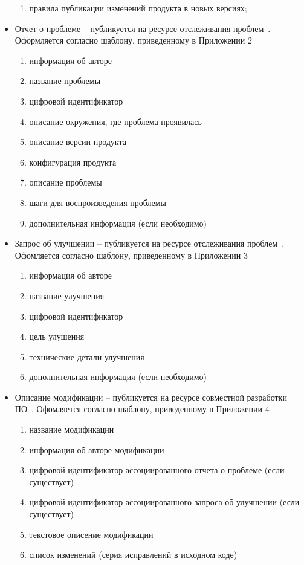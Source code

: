 \begin{itemize}
\begin{enumerate}
        \item правила публикации изменений продукта в новых версиях;
    \end{enumerate}

    \item Отчет о проблеме -- публикуется на ресурсе отслеживания проблем~\cite{qemubugtracker}.
    Оформляется согласно шаблону, приведенному в Приложении 2
    \begin{enumerate}
        \item информация об авторе
        \item название проблемы
        \item цифровой идентификатор
        \item описание окружения, где проблема проявилась
        \item описание версии продукта
        \item конфигурация продукта
        \item описание проблемы
        \item шаги для воспроизведения проблемы
        \item дополнительная информация (если необходимо)
    \end{enumerate}

    \item Запрос об улучшении -- публикуется на ресурсе отслеживания проблем~\cite{qemubugtracker}.
    Офомляется согласно шаблону, приведенному в Приложении 3
    \begin{enumerate}
        \item информация об авторе
        \item название улучшения
        \item цифровой идентификатор
        \item цель улушения
        \item технические детали улучшения
        \item дополнительная информация (если необходимо)
    \end{enumerate}

    \item Описание модификации -- публикуется на ресурсе совместной разработки ПО~\cite{qemusrchosting,qemupatchew}.
    Офомляется согласно шаблону, приведенному в Приложении 4
    \begin{enumerate}
        \item название модификации
        \item информация об авторе модификации
        \item цифровой идентификатор ассоциированного отчета о проблеме (если существует)
        \item цифровой идентификатор ассоциированного запроса об улучшении (если существует)
        \item текстовое описение модификации
        \item список изменений (серия исправлений в исходном коде)
    \end{enumerate}



\end{itemize}
